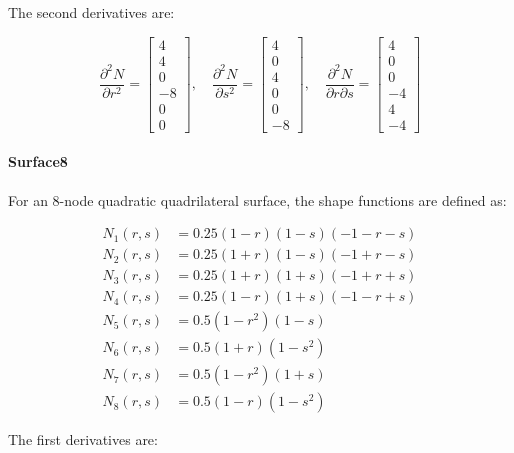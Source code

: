 The second derivatives are:

\[
\frac{\partial^2 N}{\partial r^2} =
\begin{bmatrix}
4 \\
4 \\
0 \\
-8 \\
0 \\
0
\end{bmatrix}, \quad
\frac{\partial^2 N}{\partial s^2} =
\begin{bmatrix}
4 \\
0 \\
4 \\
0 \\
0 \\
-8
\end{bmatrix}, \quad
\frac{\partial^2 N}{\partial r \partial s} =
\begin{bmatrix}
4 \\
0 \\
0 \\
-4 \\
4 \\
-4
\end{bmatrix}
\]
\paragraph{Surface8} For an 8-node quadratic quadrilateral surface, the shape functions are defined as:

\[
\begin{aligned}
N_1(r, s) &= 0.25(1 - r)(1 - s)(-1 - r - s) \\
N_2(r, s) &= 0.25(1 + r)(1 - s)(-1 + r - s) \\
N_3(r, s) &= 0.25(1 + r)(1 + s)(-1 + r + s) \\
N_4(r, s) &= 0.25(1 - r)(1 + s)(-1 - r + s) \\
N_5(r, s) &= 0.5(1 - r^2)(1 - s) \\
N_6(r, s) &= 0.5(1 + r)(1 - s^2) \\
N_7(r, s) &= 0.5(1 - r^2)(1 + s) \\
N_8(r, s) &= 0.5(1 - r)(1 - s^2)
\end{aligned}
\]

The first derivatives are:

